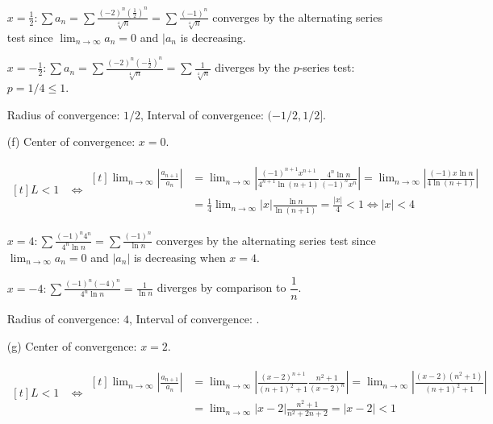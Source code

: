 \documentclass[preview, margin=0.6in]{standalone}
\begin{document}
\begin{itemize}
	$\displaystyle x=\frac12: \displaystyle \sum a_n=\sum \frac{(-2)^n \left(\frac12\right)^n}{\sqrt[4]{n}}=\sum \frac{(-1)^n}{\sqrt[4]{n}}$ converges by the alternating series test since $\lim_{n\to\infty}a_n=0$ and $|a_n$ is decreasing.

	$\displaystyle x=-\frac12: \displaystyle \sum a_n=\sum \frac{(-2)^n \left(-\frac12\right)^n}{\sqrt[4]{n}}=\sum \frac{1}{\sqrt[4]{n}}$ diverges by the $p$-series test: $p=1/4\leq1$.

	Radius of convergence: $1/2$, Interval of convergence: $\boxed{(-1/2,1/2]}$.

\item[(f)]
	Center of convergence: $x=0$.

	$\begin{aligned}[t]
		L<1
		&\iff 
		\begin{aligned}[t]
			\lim_{n\to\infty}\left|\frac{a_{n+1}}{a_n}\right|
			&=\lim_{n\to\infty}\left|\frac{(-1)^{n+1}x^{n+1}}{4^{n+1} \ln (n+1)}\frac{4^n \ln n}{(-1)^n x^n}\right|
			=\lim_{n\to\infty} \left|\frac{(-1)x\ln n}{4\ln(n+1)}\right| \\
			&=\frac14\lim_{n\to\infty}|x| \frac{\ln n}{\ln(n+1)}
			=\frac{|x|}{4}<1
			\iff |x|<4
		\end{aligned}
	\end{aligned}$

	$\displaystyle x=4: \sum \frac{(-1)^n 4^n}{4^n \ln n}=\sum \frac{(-1)^n}{\ln n}$ converges by the alternating series test since $\lim_{n\to\infty}a_n=0$ and $|a_n|$ is decreasing when $x=4$.

	$\displaystyle x=-4: \sum \frac{(-1)^n (-4)^n}{4^n \ln n}=\frac{1}{\ln n}$ diverges by comparison to $\dfrac 1n$.

	Radius of convergence: $4$, Interval of convergence: \boxed{(-4,4]}.

\item[(g)]
	Center of convergence: $x=2$.

	$\begin{aligned}[t]
		L<1
		&\iff 
		\begin{aligned}[t]
			\lim_{n\to\infty}\left|\frac{a_{n+1}}{a_n}\right|
			&=\lim_{n\to\infty}\left|\frac{(x-2)^{n+1}}{(n+1)^2+1}\frac{n^2+1}{(x-2)^n}\right|
			=\lim_{n\to\infty}\left|\frac{(x-2) \left(n^2+1\right)}{(n+1)^2+1}\right| \\
			&=\lim_{n\to\infty}\left|x-2\right|\frac{n^2+1}{n^2+2n+2}
			=|x-2|<1
		\end{aligned}
	\end{aligned}$


\end{itemize}
\end{document}
